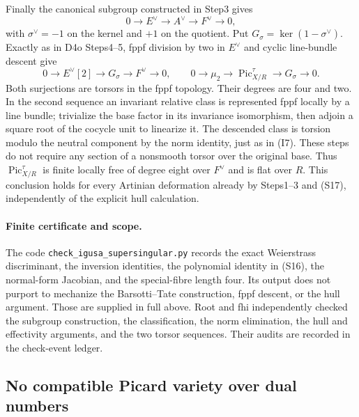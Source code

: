 Finally the canonical subgroup constructed in Step3 gives
\[
 0\longrightarrow E^\vee\longrightarrow A^\vee
 \longrightarrow F^\vee\longrightarrow0,
\]
with $\sigma^\vee=-1$ on the kernel and $+1$ on the quotient.
Put $G_\sigma=\ker(1-\sigma^\vee)$. Exactly as in D4o Steps4--5,
fppf division by two in $E^\vee$ and cyclic line-bundle descent give
\[
 0\longrightarrow E^\vee[2]\longrightarrow G_\sigma
 \longrightarrow F^\vee\longrightarrow0,
 \qquad
 0\longrightarrow\mu_2\longrightarrow
 \operatorname{Pic}^{\tau}_{X/R}\longrightarrow G_\sigma
 \longrightarrow0.                                    \tag{S17}
\]
Both surjections are torsors in the fppf topology. Their degrees
are four and two. In the second sequence an invariant relative
class is represented fppf locally by a line bundle; trivialize the
base factor in its invariance isomorphism, then adjoin a square root
of the cocycle unit to linearize it. The descended class is torsion
modulo the neutral component by the norm identity, just as in (I7).
These steps do not require any section of a nonsmooth torsor over
the original base. Thus $\operatorname{Pic}^{\tau}_{X/R}$ is finite
locally free of degree eight over $F^\vee$ and is flat over $R$.
This conclusion holds for every Artinian deformation already by
Steps1--3 and (S17), independently of the explicit hull calculation.

\paragraph{Finite certificate and scope.}
The code \texttt{check\_igusa\_supersingular.py} records the exact
Weierstrass discriminant, the inversion identities, the polynomial
identity in (S16), the normal-form Jacobian, and the special-fibre
length four. Its output does not purport to mechanize the
Barsotti--Tate construction, fppf descent, or the hull argument.
Those are supplied in full above. Root and fhi independently checked the subgroup construction, the
classification, the norm elimination, the hull and effectivity arguments,
and the two torsor sequences. Their audits are recorded in the
check-event ledger.


\subsection{No compatible Picard variety over dual numbers}
